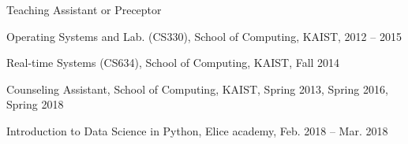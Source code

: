 \documentclass[11pt,letterpaper]{article}
\begin{document}
%


\begin{envtime}[]{Teaching Assistant or Preceptor}{}
	\item{Operating Systems and Lab. (CS330), School of Computing, KAIST}{, 2012 -- 2015}
	\item{Real-time Systems (CS634), School of Computing, KAIST}{, Fall 2014}
	\item{Counseling Assistant, School of Computing, KAIST}{, Spring 2013, Spring 2016, Spring 2018}
	\item{Introduction to Data Science in Python, Elice academy}{, Feb. 2018 -- Mar. 2018}
\end{envtime}
\end{document}
